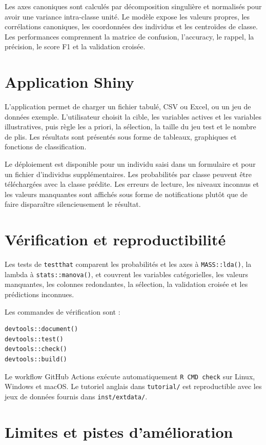 \documentclass[11pt,a4paper]{article}
\begin{document}
Les axes canoniques sont calculés par décomposition singulière et normalisés
pour avoir une variance intra-classe unité. Le modèle expose les valeurs
propres, les corrélations canoniques, les coordonnées des individus et les
centroïdes de classe. Les performances comprennent la matrice de confusion,
l'accuracy, le rappel, la précision, le score F1 et la validation croisée.

\section{Application Shiny}

L'application permet de charger un fichier tabulé, CSV ou Excel, ou un jeu de
données exemple. L'utilisateur choisit la cible, les variables actives et les
variables illustratives, puis règle les a priori, la sélection, la taille du
jeu test et le nombre de plis. Les résultats sont présentés sous forme de
tableaux, graphiques et fonctions de classification.

Le déploiement est disponible pour un individu saisi dans un formulaire et
pour un fichier d'individus supplémentaires. Les probabilités par classe
peuvent être téléchargées avec la classe prédite. Les erreurs de lecture, les
niveaux inconnus et les valeurs manquantes sont affichés sous forme de
notifications plutôt que de faire disparaître silencieusement le résultat.

\section{Vérification et reproductibilité}

Les tests de \texttt{testthat} comparent les probabilités et les axes à
\texttt{MASS::lda()}, la lambda à \texttt{stats::manova()}, et couvrent les
variables catégorielles, les valeurs manquantes, les colonnes redondantes,
la sélection, la validation croisée et les prédictions inconnues.

Les commandes de vérification sont :
\begin{verbatim}
devtools::document()
devtools::test()
devtools::check()
devtools::build()
\end{verbatim}

Le workflow GitHub Actions exécute automatiquement \texttt{R CMD check} sur
Linux, Windows et macOS. Le tutoriel anglais dans \texttt{tutorial/} est
reproductible avec les jeux de données fournis dans
\texttt{inst/extdata/}.

\section{Limites et pistes d'amélioration}
\end{document}
